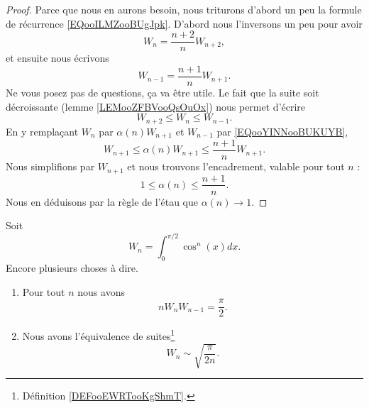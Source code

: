 \begin{proof}
	Parce que nous en aurons besoin, nous triturons d'abord un peu la formule de récurrence \eqref{EQooILMZooBUgJpk}. D'abord nous l'inversons un peu pour avoir
	\begin{equation}
		W_n=\frac{ n+2 }{ n }W_{n+2},
	\end{equation}
	et ensuite nous écrivons
	\begin{equation}        \label{EQooYINNooBUKUYB}
		W_{n-1}=\frac{ n+1 }{ n }W_{n+1}.
	\end{equation}
	Ne vous posez pas de questions, ça va être utile. Le fait que la suite soit décroissante (lemme \ref{LEMooZFBVooQsOuOx}) nous permet d'écrire
	\begin{equation}
		W_{n+2}\leq W_n\leq W_{n-1}.
	\end{equation}
	En y remplaçant \( W_n\) par \( \alpha(n)W_{n+1}\) et \( W_{n-1}\) par \eqref{EQooYINNooBUKUYB},
	\begin{equation}
		W_{n+1}\leq \alpha(n)W_{n+1}\leq \frac{ n+1 }{ n }W_{n+1}.
	\end{equation}
	Nous simplifions par \( W_{n+1}\) et nous trouvons l'encadrement, valable pour tout \( n\) :
	\begin{equation}
		1\leq \alpha(n)\leq \frac{ n+1 }{ n }.
	\end{equation}
	Nous en déduisons par la règle de l'étau que \( \alpha(n)\to 1\).
\end{proof}

\begin{lemma}       \label{LEMooWQZAooOXAPQO}
	Soit
	\begin{equation}
		W_n=\int_0^{\pi/2}\cos^n(x)dx.
	\end{equation}
	Encore plusieurs choses à dire.
	\begin{enumerate}
		\item
		      Pour tout \( n\) nous avons
		      \begin{equation}        \label{EQooLOLFooMIwMXN}
			      nW_nW_{n-1}=\frac{ \pi }{2}.
		      \end{equation}
		\item
		      Nous avons l'équivalence de suites\footnote{Définition \ref{DEFooEWRTooKgShmT}.}
		      \begin{equation}
			      W_n\sim\sqrt{ \frac{ \pi }{ 2n } }.
		      \end{equation}
	\end{enumerate}
\end{lemma}

